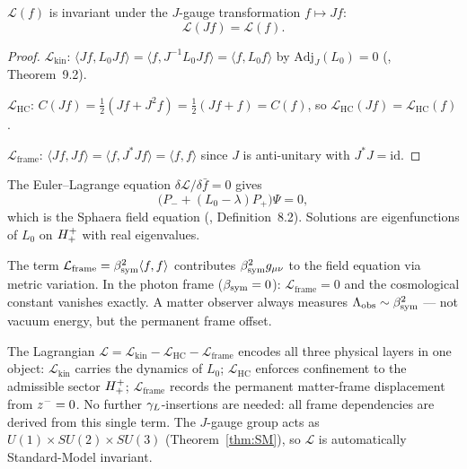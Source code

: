 \begin{theorem}\label{thm:gauge-invariance}
$\mathcal{L}(f)$ is invariant under the $J$-gauge transformation
$f\mapsto Jf$:
\[
 \mathcal{L}(Jf) = \mathcal{L}(f).
\]
\end{theorem}

\begin{proof}
$\mathcal{L}_{\mathrm{kin}}$:
$\langle Jf,L_0 Jf\rangle = \langle f,J^{-1}L_0 Jf\rangle
= \langle f,L_0 f\rangle$
by $\mathrm{Adj}_J(L_0)=0$ (\cite{brendecke2026rh}, Theorem~9.2).

$\mathcal{L}_{\mathrm{HC}}$:
$C(Jf)=\tfrac{1}{2}(Jf+J^2 f)=\tfrac{1}{2}(Jf+f)=C(f)$,
so $\mathcal{L}_{\mathrm{HC}}(Jf)=\mathcal{L}_{\mathrm{HC}}(f)$.

$\mathcal{L}_{\mathrm{frame}}$:
$\langle Jf,Jf\rangle=\langle f,J^*Jf\rangle=\langle f,f\rangle$
since $J$ is anti-unitary with $J^*J=\mathrm{id}$.
\end{proof}

\begin{theorem}
\label{thm:eom}
The Euler--Lagrange equation $\delta\mathcal{L}/\delta\bar f=0$ gives
\[
 \bigl(P_-+(L_0-\lambda)P_+\bigr)\Psi=0,
\]
which is the Sphaera field equation (\cite{brendecke2026rh}, Definition~8.2).
Solutions are eigenfunctions of $L_0$ on $H^+_+$ with real
eigenvalues.
\end{theorem}


\begin{proposition}
\label{prop:lambda-from-frame}
The term $\mathcal{L}_{\mathrm{frame}}=\beta_{\mathrm{sym}}^2\langle f,f\rangle$
contributes $\beta_{\mathrm{sym}}^2 g_{\mu\nu}$ to the field equation via metric
variation.
In the photon frame ($\beta_{\mathrm{sym}}=0$): $\mathcal{L}_{\mathrm{frame}}=0$
and the cosmological constant vanishes exactly.
A matter observer always measures $\Lambda_{\mathrm{obs}}\sim\beta_{\mathrm{sym}}^2$
--- not vacuum energy, but the permanent frame offset.
\end{proposition}

\begin{remark}
The Lagrangian $\mathcal{L}=\mathcal{L}_{\mathrm{kin}}
-\mathcal{L}_{\mathrm{HC}}-\mathcal{L}_{\mathrm{frame}}$ encodes all
three physical layers in one object:
$\mathcal{L}_{\mathrm{kin}}$ carries the dynamics of $L_0$;
$\mathcal{L}_{\mathrm{HC}}$ enforces confinement to the admissible
sector $H^+_+$;
$\mathcal{L}_{\mathrm{frame}}$ records the permanent matter-frame
displacement from $z^-=0$.
No further $\gamma_L$-insertions are needed: all frame dependencies are
derived from this single term.
The $J$-gauge group acts as $U(1)\times SU(2)\times SU(3)$
(Theorem~\ref{thm:SM}), so $\mathcal{L}$ is automatically
Standard-Model invariant.
\end{remark}


